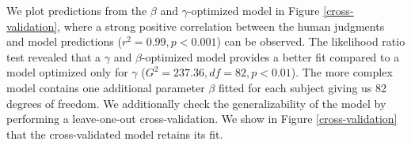 \documentclass[10pt,a4paper]{article}
\begin{document}

 

We plot predictions from the $\beta$ and $\gamma$-optimized model in Figure \ref{cross-validation}, where a strong positive correlation between the human judgments and model predictions ($r^2 = 0.99, p < 0.001$) can be observed. The likelihood ratio test revealed that a $\gamma$ and $\beta$-optimized model provides a better fit compared to a model optimized only for $\gamma$ ($G^2 = 237.36, df = 82, p < 0.01$). The more complex model contains one additional parameter $\beta$ fitted for each subject giving us 82 degrees of freedom. We additionally check the generalizability of the model by performing a leave-one-out cross-validation. We show in Figure \ref{cross-validation} that the cross-validated model retains its fit.
\end{document}
